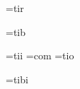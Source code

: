 


\def\TeX{T\kern-.1em\lower.4ex\hbox{E}\kern-.09emX}
\def\MathTime{{\it MathT\kern-.05em\i me}}
\def\AMSTeX{$\script A$\kern-.3em\lower.5ex\hbox{$\script M$}%
  \kern-.17em$\script *S$-\TeX}







\font\tenrm=tir   %



\font\tenbf=tib %

\font\tenit=tii %
\font\tentt=com %
\font\tensl=tio %

\font\tenbi=tibi %


